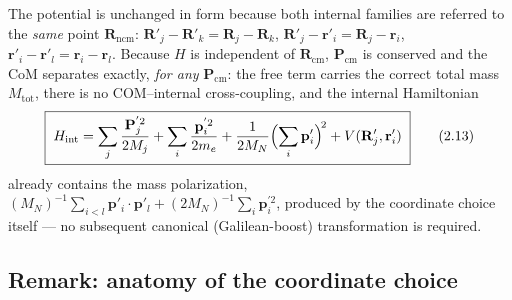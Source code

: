 The potential is unchanged in form because both internal families are referred to the \emph{same} point $\mathbf{R}_{\mathrm{ncm}}$: $\mathbf{R}'_j-\mathbf{R}'_k = \mathbf{R}_j-\mathbf{R}_k$, $\mathbf{R}'_j-\mathbf{r}'_i = \mathbf{R}_j-\mathbf{r}_i$, $\mathbf{r}'_i-\mathbf{r}'_l = \mathbf{r}_i-\mathbf{r}_l$. Because $H$ is independent of $\mathbf{R}_{\mathrm{cm}}$, $\mathbf{P}_{\mathrm{cm}}$ is conserved and the CoM separates exactly, \emph{for any} $\mathbf{P}_{\mathrm{cm}}$: the free term carries the correct total mass $M_{\mathrm{tot}}$, there is no COM--internal cross-coupling, and the internal Hamiltonian
\begin{equation}
\boxed{\;H_{\mathrm{int}} = \sum_j\frac{\mathbf{P}_j^{'2}}{2M_j} + \sum_i\frac{\mathbf{p}_i^{'2}}{2m_e} + \frac{1}{2M_N}\Bigl(\sum_i\mathbf{p}'_i\Bigr)^{\!2} + V(\mathbf{R}'_j,\mathbf{r}'_i)\;}\tag{2.13}
\end{equation}
already contains the mass polarization, $(M_N)^{-1}\sum_{i<l}\mathbf{p}'_i\cdot\mathbf{p}'_l + (2M_N)^{-1}\sum_i\mathbf{p}_i^{'2}$, produced by the coordinate choice itself --- no subsequent canonical (Galilean-boost) transformation is required.

\subsection{Remark: anatomy of the coordinate choice}


